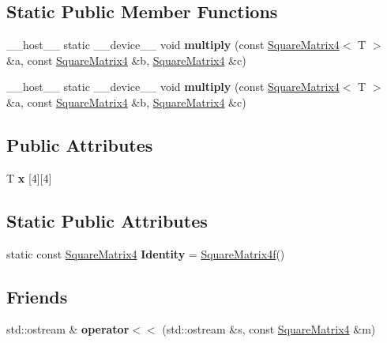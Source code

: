 \subsection*{Static Public Member Functions}
\begin{DoxyCompactItemize}
\item 
\+\_\+\+\_\+host\+\_\+\+\_\+ static \+\_\+\+\_\+device\+\_\+\+\_\+ void {\bfseries multiply} (const \hyperlink{class_square_matrix4}{Square\+Matrix4}$<$ T $>$ \&a, const \hyperlink{class_square_matrix4}{Square\+Matrix4} \&b, \hyperlink{class_square_matrix4}{Square\+Matrix4} \&c)\hypertarget{class_square_matrix4_a8d4381e883a6e4a7d7e2813ebc2a7af3}{}\label{class_square_matrix4_a8d4381e883a6e4a7d7e2813ebc2a7af3}

\item 
\+\_\+\+\_\+host\+\_\+\+\_\+ static \+\_\+\+\_\+device\+\_\+\+\_\+ void {\bfseries multiply} (const \hyperlink{class_square_matrix4}{Square\+Matrix4}$<$ T $>$ \&a, const \hyperlink{class_square_matrix4}{Square\+Matrix4} \&b, \hyperlink{class_square_matrix4}{Square\+Matrix4} \&c)\hypertarget{class_square_matrix4_a8d4381e883a6e4a7d7e2813ebc2a7af3}{}\label{class_square_matrix4_a8d4381e883a6e4a7d7e2813ebc2a7af3}

\end{DoxyCompactItemize}
\subsection*{Public Attributes}
\begin{DoxyCompactItemize}
\item 
T {\bfseries x} \mbox{[}4\mbox{]}\mbox{[}4\mbox{]}
\end{DoxyCompactItemize}
\subsection*{Static Public Attributes}
\begin{DoxyCompactItemize}
\item 
static const \hyperlink{class_square_matrix4}{Square\+Matrix4} {\bfseries Identity} = \hyperlink{class_square_matrix4}{Square\+Matrix4f}()\hypertarget{class_square_matrix4_a17173c29287b7d4206d9bfddb2ad8d0e}{}\label{class_square_matrix4_a17173c29287b7d4206d9bfddb2ad8d0e}

\end{DoxyCompactItemize}
\subsection*{Friends}
\begin{DoxyCompactItemize}
\item 
std\+::ostream \& {\bfseries operator$<$$<$} (std\+::ostream \&s, const \hyperlink{class_square_matrix4}{Square\+Matrix4} \&m)\hypertarget{class_square_matrix4_a548d172ab42d8b780f4c8daaf221a43e}{}\label{class_square_matrix4_a548d172ab42d8b780f4c8daaf221a43e}

\end{DoxyCompactItemize}



